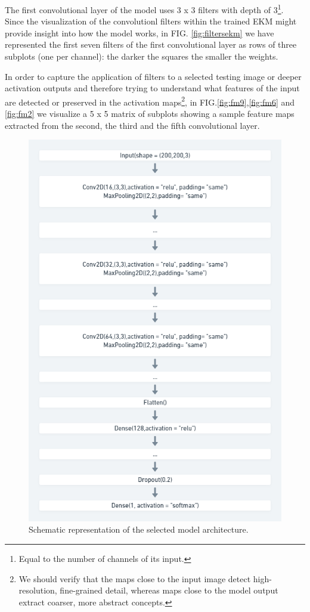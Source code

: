\documentclass[aps,twocolumn,secnumarabic,nobalancelastpage,amsmath,amssymb,
nofootinbib]{revtex4}
\begin{document}
The first convolutional layer of the model uses 3 x 3 filters with depth of 3\footnote{Equal to the number of channels of its input.}. Since the visualization of the convolutionl filters within the trained EKM might provide insight into how the model works, in FIG.  \ref{fig:filtersekm} we have represented the first seven filters of the first convolutional layer as rows of three subplots (one per channel): the darker the squares the smaller the weights.

In order to capture the application of filters to a selected testing image or deeper activation outputs and therefore trying to understand what features of the input are detected or preserved in the activation maps\footnote{We should verify that the maps close to the input image
	detect high-resolution, fine-grained detail, whereas maps close to the
	model output extract coarser, more abstract concepts.}, in FIG.\ref{fig:fm9},\ref{fig:fm6} and \ref{fig:fm2} we visualize a 5 x 5 matrix of subplots
showing a sample feature maps extracted from the second, the third and the fifth convolutional layer.

\begin{figure}
	\centering
	\includegraphics[width=0.7\linewidth]{Images/BaseNetShort}
	\caption{Schematic representation of the selected model architecture.}\label{fig:basenet}
\end{figure}
\end{document}
